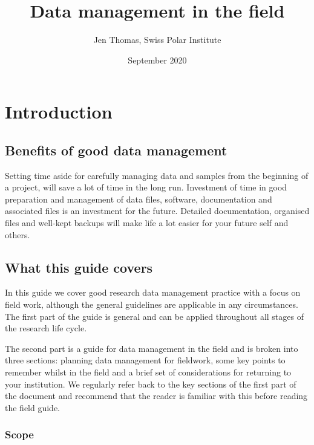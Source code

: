 \documentclass[12pt,a4paper,oneside]{report}
\title{Data management in the field}
\author{Jen Thomas, Swiss Polar Institute}
\date{September 2020}
\begin{document}
\maketitle

{
\hypersetup{linkcolor=}
\setcounter{tocdepth}{1}
\tableofcontents
}
\hypertarget{introduction}{%
\chapter{Introduction}\label{introduction}}

\hypertarget{benefits-of-good-data-management}{%
\section{Benefits of good data
management}\label{benefits-of-good-data-management}}

Setting time aside for carefully managing data and samples from the
beginning of a project, will save a lot of time in the long run.
Investment of time in good preparation and management of data files,
software, documentation and associated files is an investment for the
future. Detailed documentation, organised files and well-kept backups
will make life a lot easier for your future self and others.

\hypertarget{what-this-guide-covers}{%
\section{What this guide covers}\label{what-this-guide-covers}}

In this guide we cover good research data management practice with a
focus on field work, although the general guidelines are applicable in
any circumstances. The first part of the guide is general and can be
applied throughout all stages of the research life cycle.

The second part is a guide for data management in the field and is
broken into three sections: planning data management for fieldwork, some
key points to remember whilst in the field and a brief set of
considerations for returning to your institution. We regularly refer
back to the key sections of the first part of the document and recommend
that the reader is familiar with this before reading the field guide.

\hypertarget{scope}{%
\subsection{Scope}\label{scope}}
\end{document}
